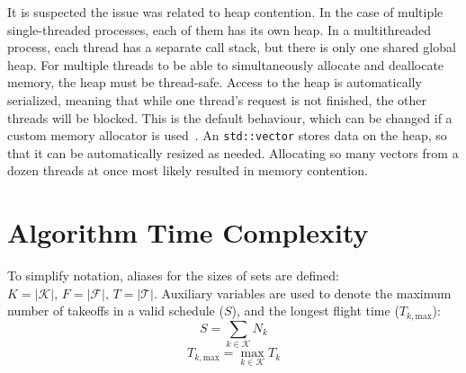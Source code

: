 It is suspected the issue was related to heap contention.
In the case of multiple single-threaded processes, each of them has its own heap.
In a multithreaded process, each thread has a separate call stack, but there is only one shared global heap.
For multiple threads to be able to simultaneously allocate and deallocate memory, the heap must be thread-safe.
Access to the heap is automatically serialized, meaning that while one thread's request is not finished, the other threads will be blocked.
This is the default behaviour, which can be changed if a custom memory allocator is used~\cite{Ferreira/MemoryAllocators}.
An \texttt{std::vector} stores data on the heap, so that it can be automatically resized as needed.
Allocating so many vectors from a dozen threads at once most likely resulted in memory contention.


\section{Algorithm Time Complexity}

\def\Tkmax{T_{k, \mathrm{max}}}

To simplify notation, aliases for the sizes of sets are defined: $K = \vert \mathcal{K} \vert,\, F = \vert \mathcal{F} \vert,\, T = \vert \mathcal{T} \vert$.
Auxiliary variables are used to denote the maximum number of takeoffs in a valid schedule ($S$), and the longest flight time ($\Tkmax$):
\begin{equation}
S = \sum_{k \in \mathcal{K}}{N_k}
\end{equation}
\begin{equation}
\Tkmax = \max_{k \in \mathcal{K}} T_k
\end{equation}

